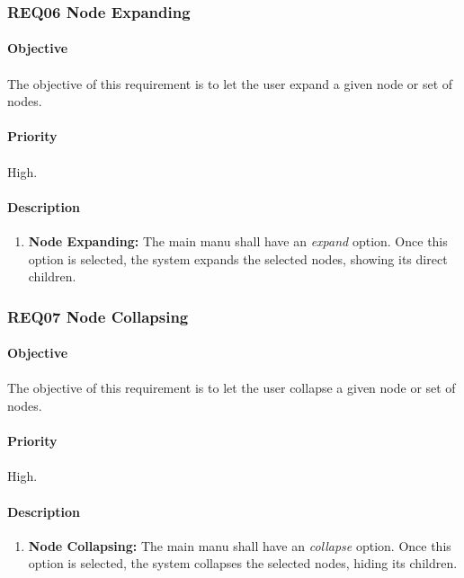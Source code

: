 \documentclass[10pt,a4paper]{article}
\begin{document}
  \subsubsection{REQ06 Node Expanding}
\paragraph{Objective}
\paragraph{}
The objective of this requirement is to let the user expand a given node or set of nodes.
\paragraph{Priority}
\paragraph{}
High.
\paragraph{Description}
  \begin{enumerate}
    \item \textbf{Node Expanding: }
	The main manu shall have an \emph{expand} option. Once this option is selected, the system expands the selected nodes, showing its direct children.
    \end{enumerate}

  \subsubsection{REQ07 Node Collapsing}
\paragraph{Objective}
\paragraph{}
The objective of this requirement is to let the user collapse a given node or set of nodes.
\paragraph{Priority}
\paragraph{}
High.
\paragraph{Description}
  \begin{enumerate}
    \item \textbf{Node Collapsing: }
	The main manu shall have an \emph{collapse} option. Once this option is selected, the system collapses the selected nodes, hiding its children.
    \end{enumerate}
\end{document}
